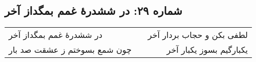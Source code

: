\begin{center}
\section*{شماره ۲۹: در ششدرۀ غمم بمگداز آخر}
\label{sec:029}
\begin{longtable}{l p{0.5cm} r}
در ششدرهٔ غمم بمگداز آخر
&&
لطفی بکن و حجاب بردار آخر
\\
چون شمع بسوختم ز عشقت صد بار
&&
یکبارگیم بسوز یکبار آخر
\\
\end{longtable}
\end{center}
